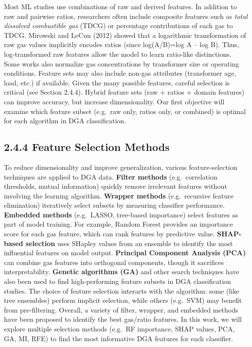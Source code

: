 Most ML studies use combinations of raw and derived features. In
addition to raw and pairwise ratios, researchers often include composite
features such as \emph{total dissolved combustible gas} (TDCG) or
percentage contributions of each gas to TDCG. Mirowski and LeCun (2012)
showed that a logarithmic transformation of raw gas values implicitly
encodes ratios (since log(A/B)=log A -- log B). Thus, log-transformed
raw features allow the model to learn ratio-like distinctions. Some
works also normalize gas concentrations by transformer size or operating
conditions. Feature sets may also include non-gas attributes
(transformer age, load, etc.) if available. Given the many possible
features, careful selection is critical (see Section 2.4.4). Hybrid
feature sets (raw + ratios + domain features) can improve accuracy, but
increase dimensionality. Our first objective will examine which feature
subset (e.g.~raw only, ratios only, or combined) is optimal for each
algorithm in DGA classification.

\subsection{2.4.4 Feature Selection
Methods}\label{feature-selection-methods}

To reduce dimensionality and improve generalization, various
feature-selection techniques are applied to DGA data. \textbf{Filter
methods} (e.g.~correlation thresholds, mutual information) quickly
remove irrelevant features without involving the learning algorithm.
\textbf{Wrapper methods} (e.g.~recursive feature elimination)
iteratively select subsets by measuring classifier performance.
\textbf{Embedded methods} (e.g.~LASSO, tree-based importance) select
features as part of model training. For example, Random Forest provides
an importance score for each gas feature, which can rank features by
predictive value. \textbf{SHAP-based selection} uses SHapley values from
an ensemble to identify the most influential features on model output.
\textbf{Principal Component Analysis (PCA)} can combine gas features
into orthogonal components, though it sacrifices interpretability.
\textbf{Genetic algorithms (GA)} and other search techniques have also
been used to find high-performing feature subsets in DGA classification
studies. The choice of feature selection interacts with the algorithm:
some (like tree ensembles) perform implicit selection, while others
(e.g.~SVM) may benefit from pre-filtering. Overall, a variety of filter,
wrapper, and embedded methods have been proposed to identify the best
gas/ratio features. In this work, we will explore multiple selection
methods (e.g.~RF importance, SHAP values, PCA, GA, MI, RFE) to find the
most informative DGA features for each classifier.


